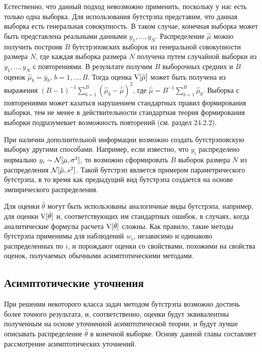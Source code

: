 Естественно, что данный подход невозможно применить, поскольку у нас есть только одна выборка. Для использования бутстрэпа представим, что данная выборка есть генеральная совокупность. В таком случае, конечная выборка может быть представлена реальными данными $y_1,\ldots, y_N$. Распределение $\hat{\mu}$ можно получить построив $B$ бутстрэповских выборок из генеральной совокупности размера $N$, где каждая выборка размера $N$ получена путем случайной выборки из $y_1,\ldots , y_N$ с повторениями. В результате получим $B$ выборочных средних и $B$ оценок $\hat{\mu}_b = \overline{y}_b$, $b = 1,\ldots, B$. Тогда оценка $\mathrm{V}[\hat{\mu}]$ может быть получена из выражения $(B-1)^{-1}\sum^B_{b=1}(\hat{\mu}_b-\overline{\hat{\mu}})^2$, где $\overline{\hat{\mu}}=B^{-1}\sum^B_{b=1}\hat{\mu}_b$. Выборка с повторениями может казаться нарушением стандартных правил формирования выборки, тем не менее в действительности  стандартная теория формирования выборки подразумевает возможность повторений (см. раздел 24.2.2).

При наличии дополнительной информации возможно  создать бутстрэповскую выборку другими способами. Например, если известно, что $y_i$ распределено нормально $y_i \sim \mathcal{N} [\mu,\sigma^2]$, то возможно сформировать $B$ выборок размера $N$ из распределения $\mathcal{N} [\hat{\mu},s^2]$. Такой бутстрэп является примером параметрического бутстрэпа, в то время как предыдущий вид бутстрэпа создается на основе эмпирического распределения.

Для оценки $\hat{\theta}$ могут быть использованы аналогичные виды бутстрэпа, например, для оценки $\mathrm{V}[\hat{\theta}]$ и, соответствующих им стандартных ошибок, в случаях, когда аналитические формулы расчета $\mathrm{V}[\hat{\theta}]$ сложны. Как правило, такие методы бутстрэпа применимы для наблюдений $w_i$, независимо и одинаково распределенных по $i$, и порождают оценки со свойствами, похожими на свойства оценок, получаемых обычными асимптотическими методами.


\subsection{Асимптотические уточнения}

При решении некоторого класса задач методом бутстрэпа возможно достичь более точного результата, и, соответственно, оценки будут эквивалентны полученным на основе уточненной асимптотической теории, и будут лучше описывать распределение  $\hat{\theta}$ в конечной выборке. Основу данной главы составляет рассмотрение асимптотических уточнений.
 
